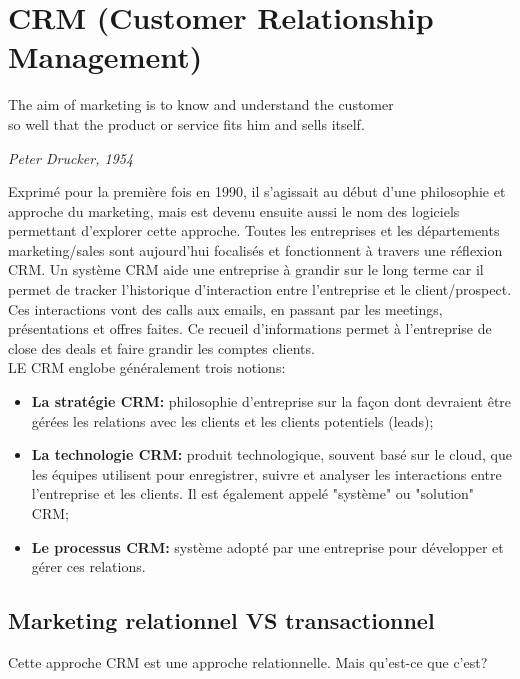 \vspace{-1.2cm}

\section{CRM (Customer Relationship Management)}

\epigraph{The aim of marketing is to know and understand the customer \\so well that the product or service fits him and sells itself.}{\textit{Peter Drucker, 1954}}

Exprimé pour la première fois en 1990, il s'agissait au début d'une philosophie et approche du marketing, mais est devenu ensuite aussi le nom des logiciels permettant d'explorer cette approche. Toutes les entreprises et les départements marketing/sales sont aujourd'hui focalisés et fonctionnent à travers une réflexion CRM. Un système CRM aide une entreprise à grandir sur le long terme car il permet de tracker l'historique d'interaction entre l'entreprise et le client/prospect. Ces interactions vont des calls aux emails, en passant par les meetings, présentations et offres faites. Ce recueil d'informations permet à l'entreprise de close des deals et faire grandir les comptes clients.\\

LE CRM englobe généralement trois notions:

\begin{itemize}
    \item \textbf{La stratégie CRM:} philosophie d'entreprise sur la façon dont devraient être gérées les relations avec les clients et les clients potentiels (leads);
    \item \textbf{La technologie CRM:} produit technologique, souvent basé sur le cloud, que les équipes utilisent pour enregistrer, suivre et analyser les interactions entre l'entreprise et les clients. Il est également appelé "système" ou "solution" CRM;
    \item \textbf{Le processus CRM:} système adopté par une entreprise pour développer et gérer ces relations.\\
\end{itemize}

\subsection{Marketing relationnel VS transactionnel}

Cette approche CRM est une approche relationnelle. Mais qu'est-ce que c'est?

